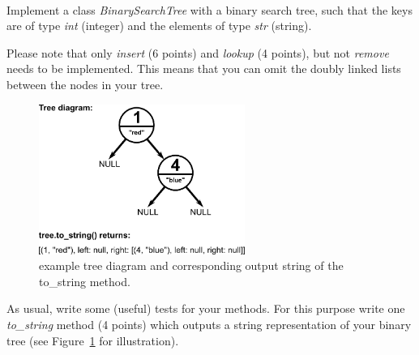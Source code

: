  \\
Implement a class \emph{BinarySearchTree} with a binary search tree, such that 
the keys are of type \emph{int} (integer) and the elements of type \emph{str} (string).

Please note that only \emph{insert} (6 points) and \emph{lookup} (4 points), 
but not \emph{remove} needs to be implemented. This means that you can omit the 
doubly linked lists between the nodes in your tree.

\begin{figure}[b]
  \begin{center}
    \includegraphics[width=0.6\textwidth]{Images/diagram.png}
  \end{center}
\caption{example tree diagram and corresponding output string of the to\_string method.}
\label{fig:diagram}
\end{figure}

As usual, write some (useful) tests for your methods. For this purpose write 
one \emph{to\_string} method (4 points) which outputs a string representation of your binary tree (see Figure~\ref{fig:diagram} for illustration).
